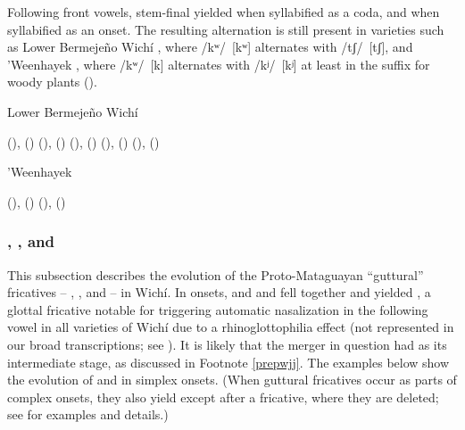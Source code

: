 \largerpage
Following front vowels, stem-final  yielded  when syllabified as a coda, and  when syllabified as an onset. The resulting alternation is still present in varieties such as Lower Bermejeño Wichí , where /kʷ/~[kʷ] alternates with /tʃ/~[tʃ], and ’Weenhayek , where /kʷ/~[k] alternates with /kʲ/~[kʲ] at least in the suffix for woody plants ().

\ea\label{ex:kw-ch:lbw}
Lower Bermejeño Wichí \citep[192]{VN14}\\
    \begin{xlist}
        \ex {} (\SG),  (\PL)
        \ex {} (\SG),  (\PL)
        \ex {} (\SG),  (\PL)
        \ex {} (\SG),  (\PL)
        \ex {} (\SG),  (\PL)
    \end{xlist}
\z

\ea\label{ex:kw-ch:whk}
’Weenhayek \citep{KC16}\\
    \begin{xlist}
        \ex {} (\SG),  (\PL)
        \ex {} (\SG),  (\PL)
    \end{xlist}
\z
{}

\subsubsection{, , and }\label{wi-jj-j-h}

This subsection describes the evolution of the Proto-Mataguayan ``guttural'' fricatives -- , , and  -- in Wichí. In onsets,  and and  fell together and yielded , a glottal fricative notable for triggering automatic nasalization in the following vowel in all varieties of Wichí due to a rhinoglottophilia effect (not represented in our broad transcriptions; see \cites[13]{KC94}[51--52]{JT09-th}[41--42]{VN14}). It is likely that the merger in question had  as its intermediate stage, as discussed in Footnote \ref{prepwjj}. The examples below show the evolution of  and  in simplex onsets. (When guttural fricatives occur as parts of complex onsets, they also yield  except after a fricative, where they are deleted; see  for examples and details.)

